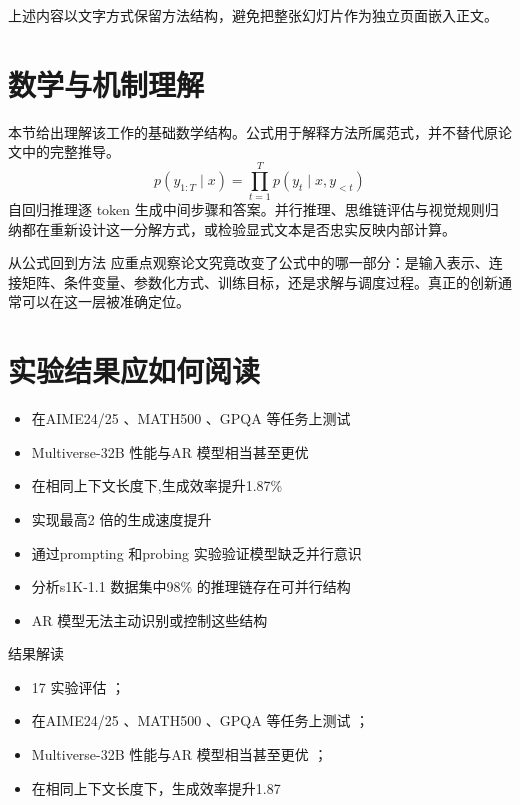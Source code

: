 \documentclass[UTF8,11pt,a4paper]{ctexart}
\begin{document}
上述内容以文字方式保留方法结构，避免把整张幻灯片作为独立页面嵌入正文。

\section{数学与机制理解}
本节给出理解该工作的基础数学结构。公式用于解释方法所属范式，并不替代原论文中的完整推导。
\begin{equation}
p(y_{1:T}\mid x)=\prod_{t=1}^{T}p(y_t\mid x,y_{<t})
\end{equation}
自回归推理逐 token 生成中间步骤和答案。并行推理、思维链评估与视觉规则归纳都在重新设计这一分解方式，或检验显式文本是否忠实反映内部计算。

\begin{keybox}{从公式回到方法}
应重点观察论文究竟改变了公式中的哪一部分：是输入表示、连接矩阵、条件变量、参数化方式、训练目标，还是求解与调度过程。真正的创新通常可以在这一层被准确定位。
\end{keybox}


\section{实验结果应如何阅读}
\begin{itemize}
\item 在AIME24/25 、MATH500 、GPQA 等任务上测试
\item Multiverse-32B 性能与AR 模型相当甚至更优
\item 在相同上下文长度下,生成效率提升1.87\%
\item 实现最高2 倍的生成速度提升
\item 通过prompting 和probing 实验验证模型缺乏并行意识
\item 分析s1K-1.1 数据集中98\% 的推理链存在可并行结构
\item AR 模型无法主动识别或控制这些结构
\end{itemize}

\begin{notebox}{结果解读}
\begin{itemize}
\item 17 实验评估 ；
\item 在AIME24/25 、MATH500 、GPQA 等任务上测试 ；
\item Multiverse-32B 性能与AR 模型相当甚至更优 ；
\item 在相同上下文长度下，生成效率提升1.87\\%
\end{itemize}
\end{notebox}
\end{document}
